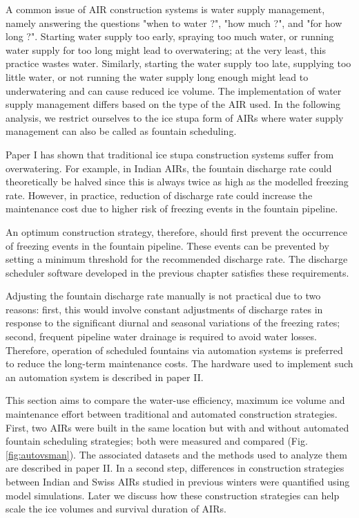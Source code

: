 A common issue of AIR construction systems is water supply management, namely answering the questions "when to
water ?", "how much ?", and "for how long ?". Starting water supply too early, spraying too much water, or
running water supply for too long might lead to overwatering; at the very least, this practice wastes water.
Similarly, starting the water supply too late, supplying too little water, or not running the water supply long
enough might lead to underwatering and can cause reduced ice volume. The implementation of water supply management
differs based on the type of the AIR used. In the following analysis, we restrict ourselves to the ice stupa
form of AIRs where water supply management can also be called as fountain scheduling.

Paper I has shown that traditional ice stupa construction systems suffer from overwatering. For example, in
Indian AIRs, the fountain discharge rate could theoretically be halved since this is always twice as high as the
modelled freezing rate. However, in practice, reduction of discharge rate could increase the maintenance cost
due to higher risk of freezing events in the fountain pipeline.

An optimum construction strategy, therefore, should first prevent the occurrence of freezing events in the
fountain pipeline. These events can be prevented by setting a minimum threshold for the recommended discharge
rate. The discharge scheduler software developed in the previous chapter satisfies these requirements.

Adjusting the fountain discharge rate manually is not practical due to two reasons: first, this would involve
constant adjustments of discharge rates in response to the significant diurnal and seasonal variations of the
freezing rates; second, frequent pipeline water drainage is required to avoid water losses. Therefore, operation
of scheduled fountains via automation systems is preferred to reduce the long-term maintenance costs. The
hardware used to implement such an automation system is described in paper II.

This section aims to compare the water-use efficiency, maximum ice volume and maintenance effort between
traditional and automated construction strategies. First, two AIRs were built in the same location but with and
without automated fountain scheduling strategies; both were measured and compared (Fig. \ref{fig:autovsman}).
The associated datasets and the methods used to analyze them are described in paper II. In a second step,
differences in construction strategies between Indian and Swiss AIRs studied in previous winters were quantified
using model simulations. Later we discuss how these construction strategies can help scale the ice volumes and
survival duration of AIRs. 

